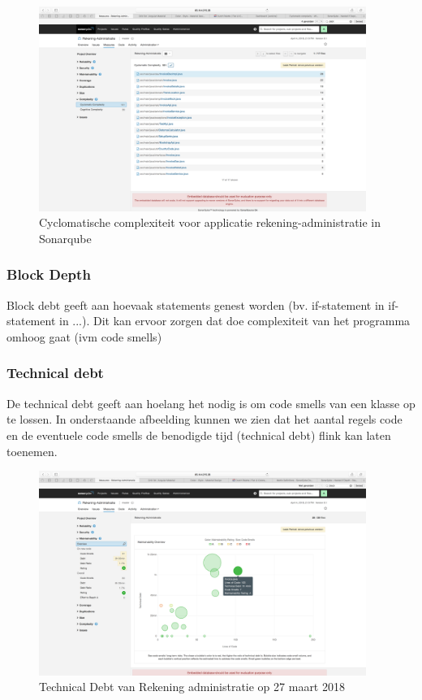 \begin{figure}[H]
	\centering
	\includegraphics[width=0.95\textwidth]{img/CyclomaticComplexity.png}
	\caption{Cyclomatische complexiteit voor applicatie rekening-administratie in Sonarqube}
	\label{fig:CyclomaticComplexity}
\end{figure}

\subsubsection{Block Depth}
Block debt geeft aan hoevaak statements genest worden (bv. if-statement in if-statement in ...). Dit kan ervoor zorgen dat doe complexiteit van het programma omhoog gaat (ivm code smells)
\subsubsection{Technical debt}
De technical debt geeft aan hoelang het nodig is om code smells van een klasse op te lossen. In onderstaande afbeelding kunnen we zien dat het aantal regels code en de eventuele code smells de benodigde tijd (technical debt) flink kan laten toenemen.

\begin{figure}[H]
	\centering
	\includegraphics[width=0.95\textwidth]{img/TechnicalDebt.png}
	\caption{Technical Debt van Rekening administratie op 27 maart 2018}
	\label{fig:TechnicalDebt}
\end{figure}
